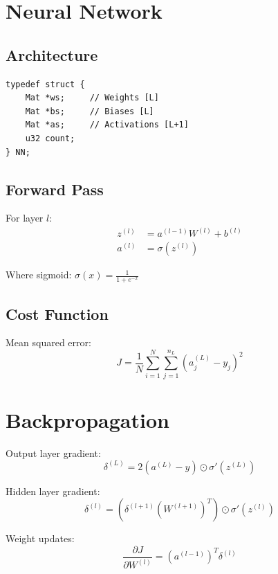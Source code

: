 \documentclass[11pt,a4paper]{article}
\begin{document}
\section{Neural Network}

\subsection{Architecture}

\begin{lstlisting}[caption={Network Structure}]
typedef struct {
    Mat *ws;     // Weights [L]
    Mat *bs;     // Biases [L]
    Mat *as;     // Activations [L+1]
    u32 count;
} NN;
\end{lstlisting}

\subsection{Forward Pass}

For layer $l$:
\begin{align}
    z^{(l)} &= a^{(l-1)} W^{(l)} + b^{(l)} \\
    a^{(l)} &= \sigma(z^{(l)})
\end{align}

Where sigmoid: $\sigma(x) = \frac{1}{1 + e^{-x}}$

\subsection{Cost Function}

Mean squared error:
\begin{equation}
    J = \frac{1}{N} \sum_{i=1}^{N} \sum_{j=1}^{n_L} (a_j^{(L)} - y_j)^2
\end{equation}

\section{Backpropagation}

Output layer gradient:
\begin{equation}
    \delta^{(L)} = 2(a^{(L)} - y) \odot \sigma'(z^{(L)})
\end{equation}

Hidden layer gradient:
\begin{equation}
    \delta^{(l)} = (\delta^{(l+1)} (W^{(l+1)})^T) \odot \sigma'(z^{(l)})
\end{equation}

Weight updates:
\begin{equation}
    \frac{\partial J}{\partial W^{(l)}} = (a^{(l-1)})^T \delta^{(l)}
\end{equation}
\end{document}
